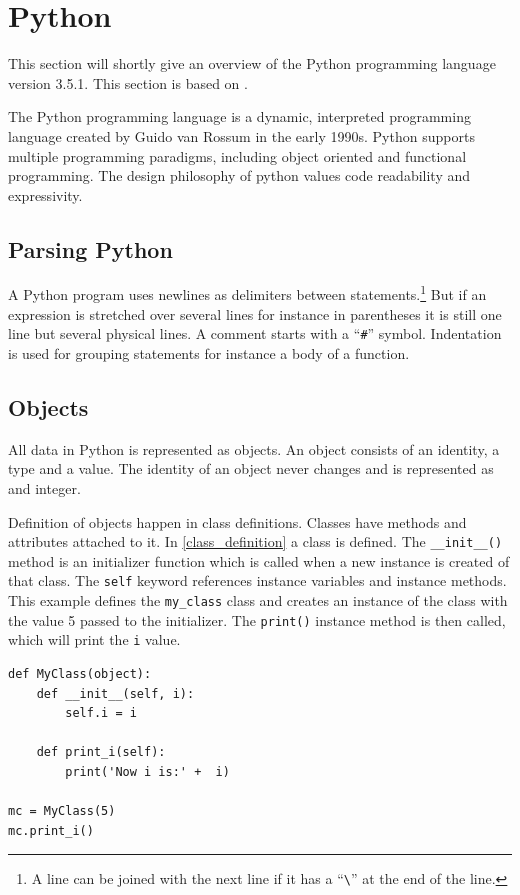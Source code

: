 \section{Python}\label{python}
This section will shortly give an overview of the Python programming language version 3.5.1.
This section is based on \citet{python_docs}.

The Python programming language is a dynamic, interpreted programming language created by Guido van Rossum in the early 1990s.
Python supports multiple programming paradigms, including object oriented and functional programming.
The design philosophy of python values code readability and expressivity.

\subsection{Parsing Python}
A Python program uses newlines as delimiters between statements.\footnote{A line can be joined with the next line if it has a ``\texttt{\textbackslash}'' at the end of the line.}
But if an expression is stretched over several lines for instance in parentheses it is still one line but several physical lines.
A comment starts with a ``\texttt{\#}'' symbol.
Indentation is used for grouping statements for instance a body of a function.

\subsection{Objects}
All data in Python is represented as objects.
An object consists of an identity, a type and a value.
The identity of an object never changes and is represented as and integer.

Definition of objects happen in class definitions.
Classes have methods and attributes attached to it.
In \cref{class_definition} a class is defined.
The \texttt{\_\_init\_\_()} method is an initializer function which is called when a new instance is created of that class.
The \texttt{self} keyword references instance variables and instance methods.
This example defines the \texttt{my\_class} class and creates an instance of the class with the value 5 passed to the initializer.
The \texttt{print()} instance method is then called, which will print the \texttt{i} value.

\begin{lstlisting}[style=python, caption={Class definition}, label=class_definition]
def MyClass(object):
    def __init__(self, i):
        self.i = i

    def print_i(self):
        print('Now i is:' +  i)

mc = MyClass(5)
mc.print_i()        
\end{lstlisting}

